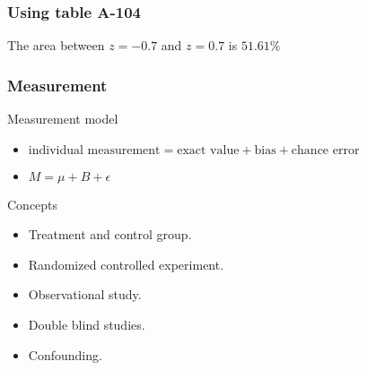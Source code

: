 \documentclass[handout]{beamer}
\begin{document}


   \begin{frame}
   \frametitle{Using table A-104}
   \begin{center}
   \end{center}
   The area between $z=-0.7$ and $z=0.7$ is $51.61\%$
   \end{frame}


   \begin{frame} \frametitle{Measurement}

   \begin{block}
   {Measurement model}

   \begin{itemize}
   \item    $
   \text{individual measurement} = \text{exact value} + \text{bias} + \text{chance error}
   $


   \item  $
   M = \mu + B + \epsilon
   $
   \end{itemize}

   \end{block}

   \begin{block}
     {Concepts}
     \begin{itemize}
     \item Treatment and control group.
       \item Randomized controlled experiment.
         \item Observational study.
           \item Double blind studies.
             \item Confounding.
     \end{itemize}
   \end{block}
   \end{frame}
\end{document}
